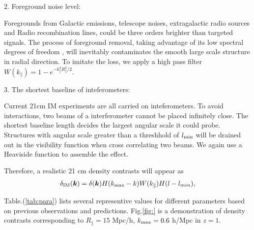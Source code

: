 2. Foreground noise level:

Foregrounds from Galactic emissions, telescope noises, 
extragalactic radio sources and Radio recombination lines, 
could be three orders brighter than targeted signals\cite{DiMatteo04,Masui13}. 
The process of foreground removal, taking advantage of its low spectral
degrees of freedom \cite{Switzer15}, 
will inevitably contaminates the smooth large scale structure in radial direction.  
To imitate the loss, we apply a high pass filter $W(k_\parallel)=1-e^{-k_\parallel^2R_\parallel^2/2}$. 

3. The shortest baseline of inteferometers:

Current 21cm IM experiments are all carried on inteferometers. 
To avoid interactions, two beams of a interferometer 
cannot be placed infinitely close. 
The shortest baseline length decides the largest 
angular scale it could probe.  
Structures with angular scale greater than a threshhold of 
$l_\mathrm{min}$ will be drained out 
in the visibility function 
when cross correlating two beams. 
We again use a Heaviside function to assemble the effect. 

Therefore, a realistic 21 cm density contrasts will appear as 
\begin{eqnarray}
\label{eq:ns}
    \delta_\mathrm{IM}(\bm{k})=\delta(\bm{k})H(k_\mathrm{max}-k)W(k_\parallel)H(l-l_{min}),
\end{eqnarray}

Table.(\ref{tab:para}) 
lists several representive values for different parameters 
based on previous observations and predictions. 
Fig.\ref{fig:} 
is a demonstration of density contrasts corresponding to 
$R_\parallel=15$ Mpc/h, $k_\mathrm{max}=0.6$ h/Mpc 
in $z=1$. 

